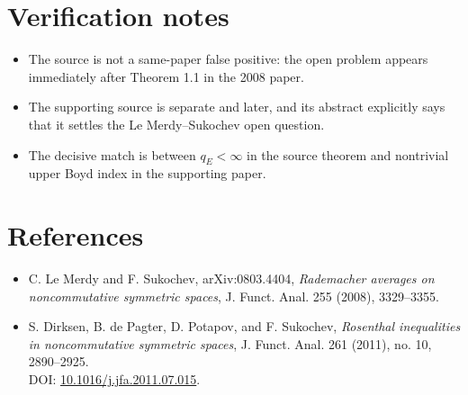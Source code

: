 \documentclass[11pt]{article}
\begin{document}
\section*{Verification notes}

\begin{itemize}
\item The source is not a same-paper false positive: the open problem appears
  immediately after Theorem 1.1 in the 2008 paper.
\item The supporting source is separate and later, and its abstract explicitly
  says that it settles the Le Merdy--Sukochev open question.
\item The decisive match is between \(q_E<\infty\) in the source theorem and
  nontrivial upper Boyd index in the supporting paper.
\end{itemize}

\section*{References}

\begin{itemize}
\item C. Le Merdy and F. Sukochev, arXiv:0803.4404,
  \emph{Rademacher averages on noncommutative symmetric spaces},
  J. Funct. Anal. 255 (2008), 3329--3355.
\item S. Dirksen, B. de Pagter, D. Potapov, and F. Sukochev,
  \emph{Rosenthal inequalities in noncommutative symmetric spaces},
  J. Funct. Anal. 261 (2011), no. 10, 2890--2925.\\
  DOI: \href{https://doi.org/10.1016/j.jfa.2011.07.015}{10.1016/j.jfa.2011.07.015}.
\end{itemize}
\end{document}
